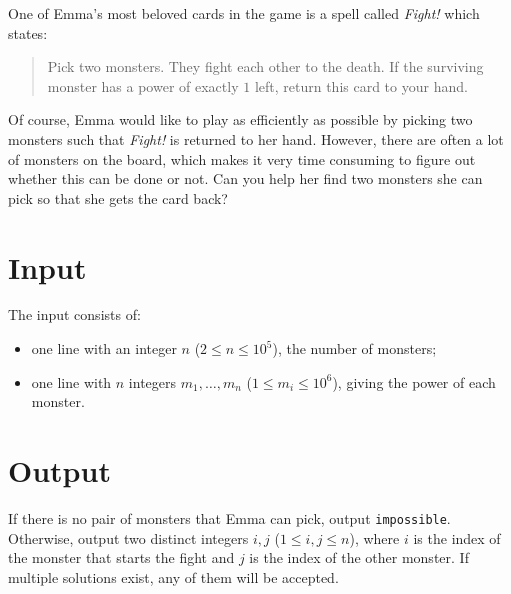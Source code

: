 One of Emma's most beloved cards in the game is a spell called \emph{Fight!} which states:

\begin{quote}
Pick two monsters. They fight each other to the death.
If the surviving monster has a power of exactly $1$ left, return this card to your hand.
\end{quote}

Of course, Emma would like to play as efficiently as possible by picking two monsters such that \emph{Fight!} is returned to her hand.
However, there are often a lot of monsters on the board, which makes it very time consuming to figure out whether this can be done or not.
Can you help her find two monsters she can pick so that she gets the card back?

\section*{Input}
The input consists of:
\begin{itemize}
	\item one line with an integer $n$ ($2 \le n \le 10^5$), the number of monsters;
  \item one line with $n$ integers $m_1, \dots, m_n$ ($1 \leq m_i \leq 10^6$), giving the power of each monster.
\end{itemize}

\section*{Output}
If there is no pair of monsters that Emma can pick, output \texttt{impossible}.
Otherwise, output two distinct integers $i, j$ ($1 \le i,j \le n$),
where $i$ is the index of the monster that starts the fight and $j$ is the index of the other monster.
If multiple solutions exist, any of them will be accepted.

